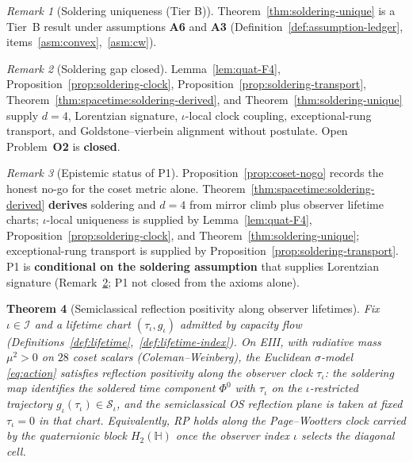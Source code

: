 \documentclass[aps,prd,onecolumn,amsmath,amssymb,nofootinbib,11pt]{revtex4-2}
\numberwithin{equation}{section}
\theoremstyle{plain}
\newtheorem{theorem}{Theorem}[section]
\theoremstyle{definition}
\theoremstyle{remark}
\newtheorem{remark}[theorem]{Remark}
\newcommand{\Quat}{\mathbb{H}}
\newcommand{\orderparam}{\Phi}
\begin{document}
\begin{remark}[Soldering uniqueness (Tier B)]
\label{rem:soldering-tier}
Theorem~\ref{thm:soldering-unique} is a Tier~B result under assumptions
\textbf{A6} and \textbf{A3} (Definition~\ref{def:assumption-ledger},
items~\ref{asm:convex},~\ref{asm:cw}).
\end{remark}

\begin{remark}[Soldering gap closed]
\label{rem:soldering-full-gap}
Lemma~\ref{lem:quat-F4}, Proposition~\ref{prop:soldering-clock},
Proposition~\ref{prop:soldering-transport},
Theorem~\ref{thm:spacetime:soldering-derived}, and
Theorem~\ref{thm:soldering-unique} supply $d=4$, Lorentzian signature,
$\iota$-local clock coupling, exceptional-rung transport, and
Goldstone--vierbein alignment without postulate. Open Problem~\textbf{O2} is
\textbf{closed}.
\end{remark}

\begin{remark}[Epistemic status of P1]
Proposition~\ref{prop:coset-nogo} records the honest no-go for the coset
metric alone. Theorem~\ref{thm:spacetime:soldering-derived} \textbf{derives}
soldering and $d=4$ from mirror climb plus observer lifetime charts;
$\iota$-local uniqueness is supplied by Lemma~\ref{lem:quat-F4},
Proposition~\ref{prop:soldering-clock}, and
Theorem~\ref{thm:soldering-unique}; exceptional-rung transport is supplied
by Proposition~\ref{prop:soldering-transport}. P1 is \textbf{conditional on the soldering assumption} that supplies Lorentzian signature
(Remark~\ref{rem:soldering-full-gap}; P1 not closed from the axioms alone).
\end{remark}

\begin{theorem}[Semiclassical reflection positivity along observer lifetimes]
\label{thm:rp}
Fix $\iota\in\mathcal{I}$ and a lifetime chart
$(\tau_\iota,g_\iota)$ admitted by capacity flow
(Definitions~\ref{def:lifetime},~\ref{def:lifetime-index}). On EIII, with
radiative mass $\mu^2>0$ on $28$ coset scalars (Coleman--Weinberg), the
Euclidean $\sigma$-model \eqref{eq:action} satisfies reflection positivity
along the observer clock $\tau_\iota$: the soldering map identifies the
soldered time component $\orderparam^0$ with $\tau_\iota$ on the
$\iota$-restricted trajectory $g_\iota(\tau_\iota)\in\mathcal{S}_\iota$, and
the semiclassical OS reflection plane is taken at fixed $\tau_\iota=0$ in
that chart. Equivalently, RP holds along the Page--Wootters clock carried by
the quaternionic block $H_2(\Quat)$ once the observer index $\iota$ selects
the diagonal cell.
\end{theorem}
\end{document}
